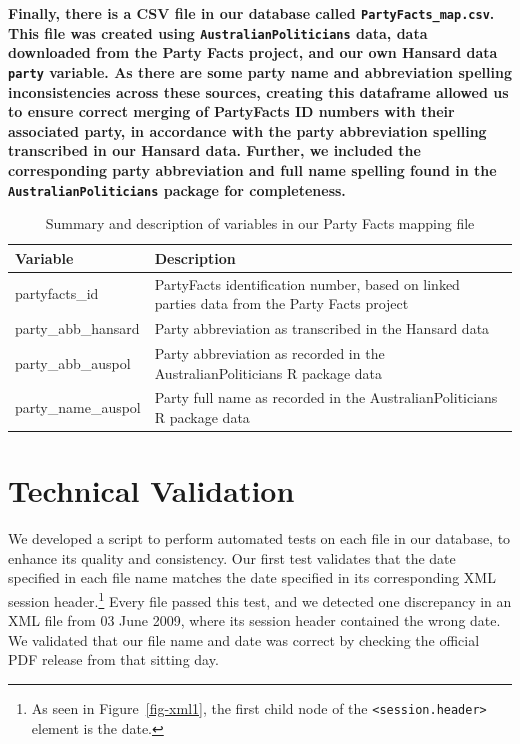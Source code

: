 \documentclass[
  letterpaper,
  DIV=11,
  numbers=noendperiod]{scrartcl}
\begin{document}
\textbf{Finally, there is a CSV file in our database called
\texttt{PartyFacts\_map.csv}. This file was created using
\texttt{AustralianPoliticians} data, data downloaded from the Party
Facts project, and our own Hansard data \texttt{party} variable. As
there are some party name and abbreviation spelling inconsistencies
across these sources, creating this dataframe allowed us to ensure
correct merging of PartyFacts ID numbers with their associated party, in
accordance with the party abbreviation spelling transcribed in our
Hansard data. Further, we included the corresponding party abbreviation
and full name spelling found in the \texttt{AustralianPoliticians}
package for completeness.}

\hypertarget{tbl-partyfacts-vars}{}
\begin{table}[H]
\caption{\label{tbl-partyfacts-vars}Summary and description of variables in our Party Facts mapping file }\tabularnewline

\centering
\begin{tabular}{>{\raggedright\arraybackslash}p{10em}>{\raggedright\arraybackslash}p{25em}}
\toprule
Variable & Description\\
\midrule
partyfacts\_id & PartyFacts identification number, based on linked parties data from the Party Facts project\\
party\_abb\_hansard & Party abbreviation as transcribed in the Hansard data\\
party\_abb\_auspol & Party abbreviation as recorded in the AustralianPoliticians R package data\\
party\_name\_auspol & Party full name as recorded in the AustralianPoliticians R package data\\
\bottomrule
\end{tabular}
\end{table}

\hypertarget{technical-validation}{%
\section{Technical Validation}\label{technical-validation}}

We developed a script to perform automated tests on each file in our
database, to enhance its quality and consistency. Our first test
validates that the date specified in each file name matches the date
specified in its corresponding XML session header.\footnote{As seen in
  Figure~\ref{fig-xml1}, the first child node of the
  \texttt{\textless{}session.header\textgreater{}} element is the date.}
Every file passed this test, and we detected one discrepancy in an XML
file from 03 June 2009, where its session header contained the wrong
date. We validated that our file name and date was correct by checking
the official PDF release from that sitting day.
\end{document}
